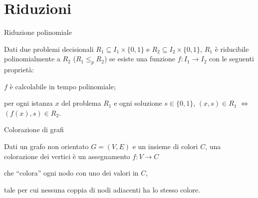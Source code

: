 \section{Riduzioni}

\begin{frame}{Riduzione polinomiale}

\vspace{-9pt}
\begin{myboxtitle}
Dati due problemi decisionali $R_1 \subseteq I_1 \times \{ 0,1 \}$ e
$R_2 \subseteq I_2 \times \{ 0,1 \}$, $R_1$ è \alert{riducibile polinomialmente} a $R_2$ (\alert{$R_1 \leq_p R_2$}) se esiste una funzione
$f: I_1 \rightarrow I_2$ con le seguenti proprietà:
\BI
\item $f$ è calcolabile in tempo polinomiale;
\item per ogni istanza $x$ del problema $R_1$ e
  ogni soluzione $s \in \{ 0,1 \}$, 
  $(x,s) \in R_1$ $\Leftrightarrow$ $(f(x),s) \in R_2$.
\EI
\end{myboxtitle}


\end{frame}

\begin{frame}{Colorazione di grafi}

\vspace{-9pt}
\begin{myboxtitle}
Dati un grafo non orientato $G=(V,E)$ e un insieme di colori $C$, una \alert{colorazione} dei vertici è un assegnamento  $f: V \rightarrow C$
\BI
\item che ``colora'' ogni nodo con uno dei valori in $C$, 
\item tale per cui nessuna coppia di nodi adiacenti ha lo stesso colore.
\EI
\end{myboxtitle}

\vspace{-12pt}
\end{frame}

